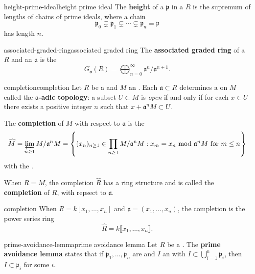 \begin{topic}{height-prime-ideal}{height prime ideal}
    The \textbf{height} of a  $\mathfrak{p}$ in a  $R$ is the supremum of lengths of chains of prime ideals, where a chain
    \[ \mathfrak{p}_0 \subsetneq \mathfrak{p}_1 \subsetneq \cdots \subsetneq \mathfrak{p}_n = \mathfrak{p} \]
    has length $n$.
\end{topic}

\begin{topic}{associated-graded-ring}{associated graded ring}
    The \textbf{associated graded ring} of a  $R$ and an  $\mathfrak{a}$ is the 
    \[ G_\mathfrak{a}(R) = \bigoplus_{n = 0}^{\infty} \mathfrak{a}^n / \mathfrak{a}^{n + 1} . \]
\end{topic}

\begin{topic}{completion}{completion}
    Let $R$ be a  and $M$ an . Each  $\mathfrak{a} \subset R$ determines a  on $M$ called the \textbf{$\mathfrak{a}$-adic topology}: a subset $U \subset M$ is \textit{open} if and only if for each $x \in U$ there exists a positive integer $n$ such that $x + \mathfrak{a}^n M \subset U$.
    
    The \textbf{completion} of $M$ with respect to $\mathfrak{a}$ is the 
    \[ \widehat{M} = \varprojlim_{n \ge 1} M / \mathfrak{a}^n M = \left\{ (x_n)_{n \ge 1} \in \prod_{n \ge 1} M / \mathfrak{a}^n M : x_m = x_n \mod \mathfrak{a}^n M \textup{ for } m \le n \right\} \]
    with the  .
    
    When $R = M$, the completion $\widehat{R}$ has a ring structure and is called the \textbf{completion} of $R$, with repsect to $\mathfrak{a}$.
\end{topic}

\begin{example}{completion}
    When $R = k[x_1, \ldots, x_n]$ and $\mathfrak{a} = (x_1, \ldots, x_n)$, the completion is the power series ring
    \[ \widehat{R} = k\llbracket x_1, \ldots, x_n \rrbracket . \]
\end{example}

\begin{topic}{prime-avoidance-lemma}{prime avoidance lemma}
    Let $R$ be a . The \textbf{prime avoidance lemma} states that if $\mathfrak{p}_1, \ldots, \mathfrak{p}_n$ are  and $I$ an  with $I \subset \bigcup_{i = 1}^{n} \mathfrak{p}_i$, then $I \subset \mathfrak{p}_i$ for some $i$.
\end{topic}

